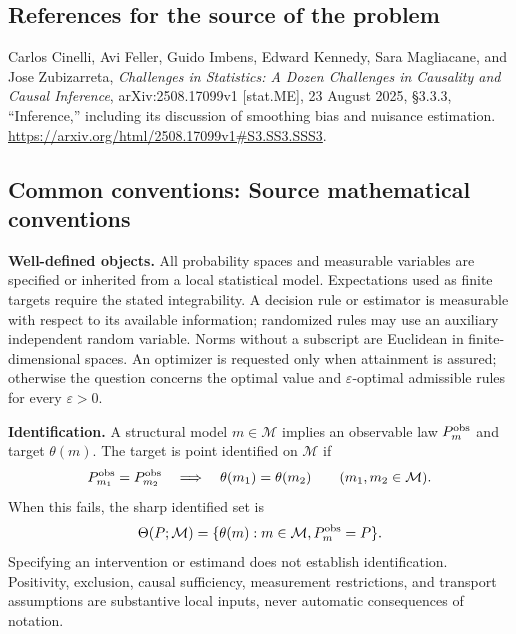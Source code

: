 \documentclass[11pt,a4paper]{article}
\begin{document}
\subsection*{References for the source of the problem}
Carlos Cinelli, Avi Feller, Guido Imbens, Edward Kennedy, Sara Magliacane, and Jose Zubizarreta, \emph{Challenges in Statistics: A Dozen Challenges in Causality and Causal Inference}, arXiv:2508.17099v1 [stat.ME], 23 August 2025, \S3.3.3, ``Inference,'' including its discussion of smoothing bias and nuisance estimation. \url{https://arxiv.org/html/2508.17099v1#S3.SS3.SSS3}.

\subsection*{Common conventions: Source mathematical conventions}

\textbf{Well-defined objects.}
All probability spaces and measurable variables are specified or inherited
from a local statistical model. Expectations used as finite targets require
the stated integrability. A decision rule or estimator is measurable with
respect to its available information; randomized rules may use an auxiliary
independent random variable. Norms without a subscript are Euclidean in
finite-dimensional spaces. An optimizer is requested only when attainment
is assured; otherwise the question concerns the optimal value and
$\varepsilon$-optimal admissible rules for every $\varepsilon>0$.

\textbf{Identification.}
A structural model $m\in\mathcal M$ implies an observable law
$P_m^{\rm obs}$ and target $\theta(m)$. The target is point identified on
$\mathcal M$ if
\[
 P_{m_1}^{\rm obs}=P_{m_2}^{\rm obs}
 \quad\Longrightarrow\quad\theta(m_1)=\theta(m_2)
 \qquad(m_1,m_2\in\mathcal M).
\]
When this fails, the sharp identified set is
\[
 \Theta(P;\mathcal M)=\{\theta(m):m\in\mathcal M,
                                  P_m^{\rm obs}=P\}.
\]
Specifying an intervention or estimand does not establish identification.
Positivity, exclusion, causal sufficiency, measurement restrictions, and
transport assumptions are substantive local inputs, never automatic
consequences of notation.
\end{document}
